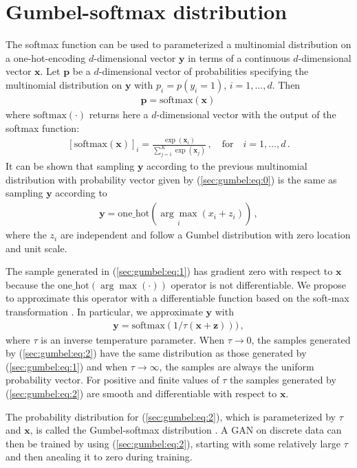 
\section{Gumbel-softmax distribution}

The softmax function can be used to parameterized a multinomial distribution
on a one-hot-encoding $d$-dimensional vector $\mathbf{y}$ in terms of a
continuous $d$-dimensional vector $\mathbf{x}$. Let $\mathbf{p}$ be a $d$-dimensional vector of probabilities
specifying the multinomial distribution on $\mathbf{y}$ with $p_i = p(y_i=1)$, $i=1,\ldots,d$. Then
\begin{align}
\mathbf{p} = \text{softmax}(\mathbf{x})\,\label{sec:gumbel:eq:0}
\end{align}
where $\text{softmax}(\cdot)$ returns here a $d$-dimensional vector with the output of the softmax function:
\begin{align}
\left[\text{softmax}(\mathbf{x})\right]_i = \frac{\exp(\mathbf{x}_i)}{\sum_{j=1}^K\exp(\mathbf{x}_j)}\,,\quad\text{for}\quad i = 1,\ldots,d\,.
\end{align}
It can be shown that sampling $\mathbf{y}$ according to the previous multinomial distribution with probability vector 
given by (\ref{sec:gumbel:eq:0}) is the same as sampling $\mathbf{y}$ according to
\begin{align}
\mathbf{y} = \text{one\_hot}(\underset{i}{\arg\max} (x_i + z_i))\,,\label{sec:gumbel:eq:1}
\end{align}
where the $z_i$ are independent and follow a Gumbel distribution with zero location and unit scale.

The sample generated in (\ref{sec:gumbel:eq:1}) has gradient zero with respect to
$\mathbf{x}$ because the $\text{one\_hot}(\arg\max(\cdot))$
operator is not differentiable.
We propose to approximate this operator with a differentiable function based on the soft-max transformation \cite{jang2016categorical}.
In particular, we approximate $\mathbf{y}$ with 
\begin{align}
\mathbf{y} = \text{softmax}(1 / \tau (\mathbf{x} + \mathbf{z})))\,,\label{sec:gumbel:eq:2}
\end{align}
where $\tau$ is an inverse temperature parameter. When $\tau \rightarrow 0$, the samples generated by (\ref{sec:gumbel:eq:2})
have the same distribution as those generated by (\ref{sec:gumbel:eq:1}) and when $\tau \rightarrow \infty$,
the samples are always the uniform probability vector. For positive and finite values
of $\tau$ the samples generated by (\ref{sec:gumbel:eq:2}) are smooth and differentiable with respect to $\mathbf{x}$.

The probability distribution for (\ref{sec:gumbel:eq:2}), which is
parameterized by $\tau$ and $\mathbf{x}$, is called the Gumbel-softmax
distribution \cite{jang2016categorical}. A GAN on discrete data can then be
trained by using (\ref{sec:gumbel:eq:2}), starting with some relatively large
$\tau$ and then anealing it to zero during training.

